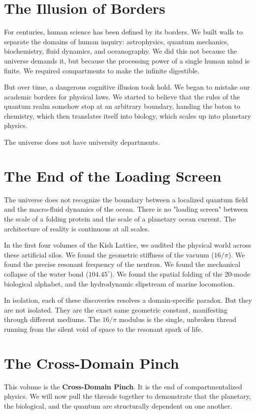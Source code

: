 \documentclass[11pt, letterpaper, openany]{book}
\begin{document}
\section*{The Illusion of Borders}
For centuries, human science has been defined by its borders. We built walls to separate the domains of human inquiry: astrophysics, quantum mechanics, biochemistry, fluid dynamics, and oceanography. We did this not because the universe demands it, but because the processing power of a single human mind is finite. We required compartments to make the infinite digestible. 

But over time, a dangerous cognitive illusion took hold. We began to mistake our academic borders for physical laws. We started to believe that the rules of the quantum realm somehow stop at an arbitrary boundary, handing the baton to chemistry, which then translates itself into biology, which scales up into planetary physics. 

The universe does not have university departments. 

\section*{The End of the Loading Screen}
The universe does not recognize the boundary between a localized quantum field and the macro-fluid dynamics of the ocean. There is no "loading screen" between the scale of a folding protein and the scale of a planetary ocean current. The architecture of reality is continuous at all scales.

In the first four volumes of the Kish Lattice, we audited the physical world across these artificial silos. We found the geometric stiffness of the vacuum ($16/\pi$). We found the precise resonant frequency of the neutron. We found the mechanical collapse of the water bond ($104.45^\circ$). We found the spatial folding of the 20-mode biological alphabet, and the hydrodynamic slipstream of marine locomotion. 

In isolation, each of these discoveries resolves a domain-specific paradox. But they are not isolated. They are the exact same geometric constant, manifesting through different mediums. The $16/\pi$ modulus is the single, unbroken thread running from the silent void of space to the resonant spark of life.

\section*{The Cross-Domain Pinch}
This volume is the \textbf{Cross-Domain Pinch}. It is the end of compartmentalized physics. We will now pull the threads together to demonstrate that the planetary, the biological, and the quantum are structurally dependent on one another. 
\end{document}
